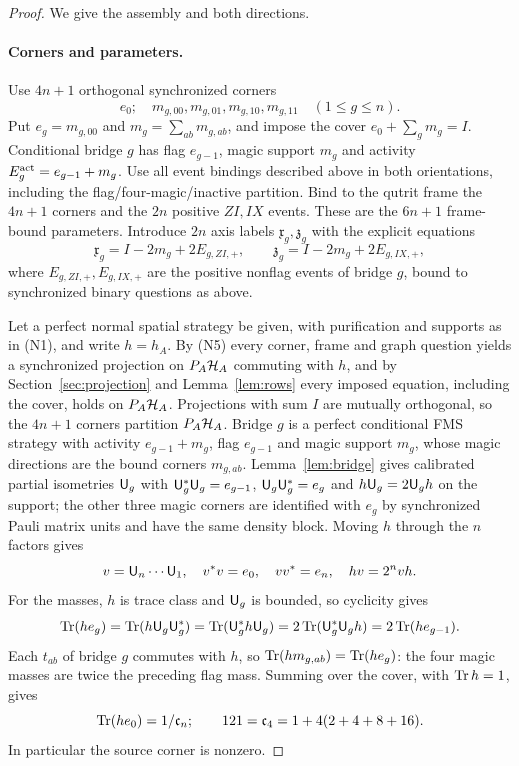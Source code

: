 \begin{proof}
We give the assembly and both directions.

\paragraph{Corners and parameters.}
Use $4n+1$ orthogonal synchronized corners
\[
 e_0;\quad m_{g,00},m_{g,01},m_{g,10},m_{g,11}\quad(1\leq g\leq n).
\]
Put $e_g=m_{g,00}$ and $m_g=\sum_{ab}m_{g,ab}$, and impose the cover $e_0+\sum_gm_g=I$. Conditional bridge $g$ has flag $e_{g-1}$, magic support $m_g$ and activity $E^{\rm act}_g=e_{g-1}+m_g$. Use all event bindings described above in both orientations, including the flag/four-magic/inactive partition. Bind to the qutrit frame the $4n+1$ corners and the $2n$ positive $ZI,IX$ events. These are the $6n+1$ frame-bound parameters. Introduce $2n$ axis labels $\mathfrak x_g,\mathfrak z_g$ with the explicit equations
\[
 \mathfrak x_g=I-2m_g+2E_{g,ZI,+},\qquad
 \mathfrak z_g=I-2m_g+2E_{g,IX,+},
\]
where $E_{g,ZI,+},E_{g,IX,+}$ are the positive nonflag events of bridge $g$, bound to synchronized binary questions as above.

Let a perfect normal spatial strategy be given, with purification and supports as in (N1), and write $h=h_A$. By (N5) every corner, frame and graph question yields a synchronized projection on $P_A\mathcal H_A$ commuting with $h$, and by Section~\ref{sec:projection} and Lemma~\ref{lem:rows} every imposed equation, including the cover, holds on $P_A\mathcal H_A$. Projections with sum $I$ are mutually orthogonal, so the $4n+1$ corners partition $P_A\mathcal H_A$. Bridge $g$ is a perfect conditional FMS strategy with activity $e_{g-1}+m_g$, flag $e_{g-1}$ and magic support $m_g$, whose magic directions are the bound corners $m_{g,ab}$. Lemma~\ref{lem:bridge} gives calibrated partial isometries ${\mathsf U}_g$ with ${\mathsf U}_g^*{\mathsf U}_g=e_{g-1}$, ${\mathsf U}_g{\mathsf U}_g^*=e_g$ and $h{\mathsf U}_g=2{\mathsf U}_gh$ on the support; the other three magic corners are identified with $e_g$ by synchronized Pauli matrix units and have the same density block. Moving $h$ through the $n$ factors gives
\begin{equation}\label{eq:fourv}
 v={\mathsf U}_n\cdots {\mathsf U}_1,\quad v^*v=e_0,\quad vv^*=e_n,\quad hv=2^nvh.
\end{equation}
For the masses, $h$ is trace class and ${\mathsf U}_g$ is bounded, so cyclicity gives
\[
 \operatorname{Tr}(he_g)=\operatorname{Tr}(h{\mathsf U}_g{\mathsf U}_g^*)=\operatorname{Tr}({\mathsf U}_g^*h{\mathsf U}_g)=2\operatorname{Tr}({\mathsf U}_g^*{\mathsf U}_gh)=2\operatorname{Tr}(he_{g-1}).
\]
Each $t_{ab}$ of bridge $g$ commutes with $h$, so $\operatorname{Tr}(hm_{g,ab})=\operatorname{Tr}(he_g)$: the four magic masses are twice the preceding flag mass. Summing over the cover, with $\operatorname{Tr} h=1$, gives
\begin{equation}\label{eq:121}
 \operatorname{Tr}(he_0)=1/\mathfrak c_n;\qquad 121=\mathfrak c_4=1+4(2+4+8+16).
\end{equation}
In particular the source corner is nonzero.


\end{proof}
